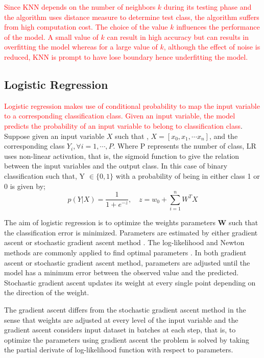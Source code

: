 \documentclass[a4paper,fleqn]{cas-dc}
\newcommand\mycorrections[1]{\textcolor{red}{#1}}
\begin{document}
\mycorrections { Since KNN  depends on the number of neighbors $k$ during its testing phase and the algorithm uses distance measure to determine test class, the algorithm suffers from high computation cost.  The choice of the value $k$ influences the performance of the model. A small value of $k$ can result in high accuracy but can results in overfitting the model whereas for a large value of $k$, although the effect of noise is reduced, KNN is prompt to have lose boundary hence underfitting the model. }
\subsection{Logistic Regression }
\mycorrections {Logistic regression makes use of conditional probability to map the input variable to a corresponding classification class. Given an input variable, the model predicts the probability of an input variable to belong to classification class}. Suppose given an input variable $X$ such that , $X = \left[ x_{0} , x_{1},\cdots x_{n}\right]$, and the corresponding class $Y_{i}, \forall i = 1,\cdots,P $. Where P represents the number of class, LR uses non-linear activation, that is, the sigmoid function to give the relation between the input variables and the output class. In this case of binary classification such that, Y $ \in \{ 0,1\}$ with a probability of being in either class 1 or 0 is given by;
\begin{equation}
p(Y| X) = \frac{1}{ 1 + e^{-z}}, \quad z = w_{0} + \sum_{i = 1}^{n} W^{T}X
\end{equation}

The aim of logistic regression is to optimize the weights parameters $\textbf{W}$ such that the classification error is minimized. Parameters are estimated by either gradient ascent or stochastic gradient ascent method \cite{bonaccorso2017machine}. The log-likelihood and Newton methods are commonly applied to find optimal parameters \cite{qi1993nonsmooth}. In both gradient ascent or stochastic gradient ascent method, parameters are adjusted until the model has a minimum error between the observed value and the predicted. Stochastic gradient ascent updates its weight at every single point depending on the direction of the weight.

The gradient ascent  differs from the stochastic gradient ascent method in the sense that weights are adjusted at every level of the input variable and the gradient ascent considers  input dataset in batches at each step, that is, to optimize the parameters using gradient ascent the problem is solved by  taking the partial derivate of log-likelihood  function with respect to parameters. 
\end{document}
